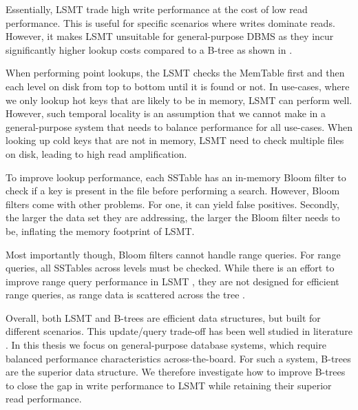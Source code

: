 
Essentially, \ac{LSMT} trade high write performance at the cost of low read performance.
This is useful for specific scenarios where writes dominate reads.
However, it makes \ac{LSMT} unsuitable for general-purpose \ac{DBMS} as they incur significantly higher lookup costs compared to a B-tree as shown in \cite{gorrod2017wiredtiger}.

When performing point lookups, the \ac{LSMT} checks the MemTable first and then each level on disk from top to bottom until it is found or not.
In use-cases, where we only lookup hot keys that are likely to be in memory, \ac{LSMT} can perform well.
However, such temporal locality is an assumption that we cannot make in a general-purpose system that needs to balance performance for all use-cases.
When looking up cold keys that are not in memory, \ac{LSMT} need to check multiple files on disk, leading to high read amplification.

To improve lookup performance, each SSTable has an in-memory Bloom filter to check if a key is present in the file before performing a search.
However, Bloom filters come with other problems. 
For one, it can yield false positives.
Secondly, the larger the data set they are addressing, the larger the Bloom filter needs to be, inflating the memory footprint of \ac{LSMT}.

Most importantly though, Bloom filters cannot handle range queries.
For range queries, all SSTables across levels must be checked. 
While there is an effort to improve range query performance in \ac{LSMT} \cite{zhong2021remix}, they are not designed for efficient range queries, as range data is scattered across the tree \cite{sarkar2022lsmt}.

Overall, both \ac{LSMT} and B-trees are efficient data structures, but built for different scenarios.
This update/query trade-off has been well studied in literature \cite{brodal2003lower}.
In this thesis we focus on general-purpose database systems, which require balanced performance characteristics across-the-board.
For such a system, B-trees are the superior data structure.
We therefore investigate how to improve B-trees to close the gap in write performance to \ac{LSMT} while retaining their superior read performance.


